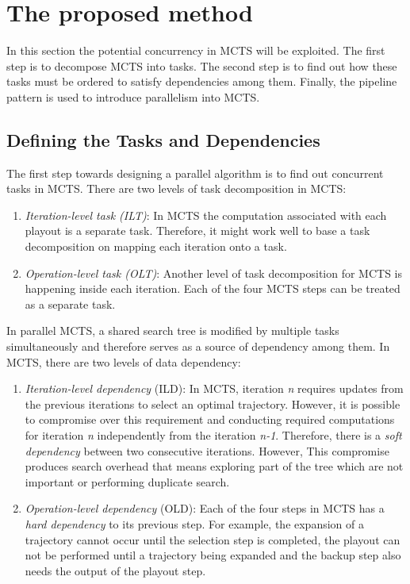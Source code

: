 \documentclass[10pt, conference, compsocconf]{IEEEtran}
\begin{document}
\section{The proposed method}
\label{sec:mctspipe}
In this section the potential concurrency in MCTS will be exploited. The first step is to decompose MCTS into tasks. The second step is to find out how these tasks must be ordered to satisfy dependencies among them. Finally, the pipeline pattern is used to introduce parallelism into MCTS.

\subsection{Defining the Tasks and Dependencies}
The first step towards designing a parallel algorithm is to find out concurrent tasks in MCTS. There are two levels of task decomposition in MCTS:
\begin{enumerate}

\item \textit{Iteration-level task (ILT)}: In MCTS the computation associated with each playout is a separate task. Therefore, it might work well to base a task decomposition on mapping each iteration onto a task. 
\item \textit{Operation-level task (OLT)}: Another level of task decomposition for MCTS is happening inside each iteration. Each of the four MCTS steps can be treated as a separate task. 

\end{enumerate}
In parallel MCTS, a shared search tree is modified by multiple tasks simultaneously and therefore serves as a source of dependency among them. In MCTS, there are two levels of data dependency:

\begin{enumerate}

\item \textit{Iteration-level dependency} (ILD): In MCTS, iteration \textit{n} requires updates from the previous iterations to select an optimal trajectory. However, it is possible to compromise over this requirement and conducting required computations for iteration \textit{n} independently from the iteration \textit{n-1}. Therefore, there is a \textit{soft dependency} between two consecutive iterations. However, This compromise produces search overhead that means exploring part of the tree which are not important or performing duplicate search. 

\item \textit{Operation-level dependency} (OLD): Each of the four steps in MCTS has a \textit{hard dependency} to its previous step. For example, the expansion of a trajectory cannot occur until the selection step is completed, the playout can not be performed until a trajectory being expanded and the backup step also needs the output of the playout step.

\end{enumerate}
\end{document}
